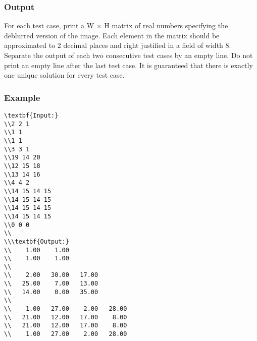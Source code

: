 \subsubsection{   Output  }

   For each test case, print a W × H matrix of real numbers specifying the deblurred version of the image. Each element in the matrix should be approximated to 2 decimal places and right justified in a field of width 8. Separate the output of each two consecutive test cases by an empty line. Do not print an empty line after the last test case. It is guaranteed that there is exactly one unique solution for every test case.  

\subsubsection{   Example  }
\begin{verbatim}
\textbf{Input:}
\\2 2 1
\\1 1
\\1 1
\\3 3 1
\\19 14 20
\\12 15 18
\\13 14 16
\\4 4 2
\\14 15 14 15
\\14 15 14 15
\\14 15 14 15
\\14 15 14 15
\\0 0 0
\\
\\\textbf{Output:}
\\    1.00    1.00 
\\    1.00    1.00
\\
\\    2.00   30.00   17.00
\\   25.00    7.00   13.00
\\   14.00    0.00   35.00
\\
\\    1.00   27.00    2.00   28.00
\\   21.00   12.00   17.00    8.00
\\   21.00   12.00   17.00    8.00
\\    1.00   27.00    2.00   28.00\end{verbatim}